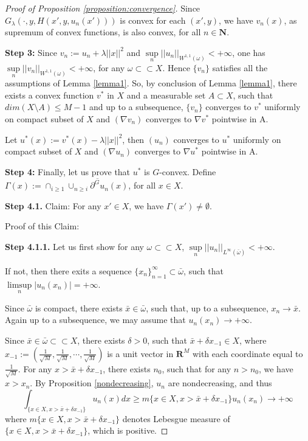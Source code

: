 \documentclass[a4paper, 11pt]{amsart}
\numberwithin{equation}{section}
\theoremstyle{plain}
\theoremstyle{definition}
\theoremstyle{remark}
\newcommand{\R}{\mathbf{R}}
\newcommand{\N}{\mathbf{N}}
\begin{document}
\begin{proof}[Proof of Proposition \ref{proposition:convergence}]
	
	Since $G_{\lambda}(\cdot,y,H(x',y,u_n(x')))$ is convex for each $(x', y)$, we have $v_n(x)$, as supremum of convex functions, is also convex, for all $n \in \N$.\medskip
	
	
	
{\bf Step 3:}	Since $v_n:= u_n +\lambda||x||^2$ and $\sup\limits_{n}||u_n||_{W^{1,1}(\omega)} < +\infty$, one has $\sup\limits_{n}||v_n||_{W^{1,1}(\omega)} < +\infty$, for any $\omega \subset \subset X$. Hence $\{v_n\}$ satisfies all the assumptions of Lemma \ref{lemma1}. So, by conclusion of Lemma \ref{lemma1}, there exists a convex function $v^*$ in $X$ and a measurable set $A \subset X$, such that $dim (X \setminus A)\le M-1$ and up to a subsequence, $\{v_n\}$ converges to $v^*$ uniformly on compact subset of $X$ and $(\nabla v_n)$ converges to $\nabla v^*$ pointwise in A.
	
	Let $u^*(x):=v^*(x)-\lambda||x||^2$, then  $(u_n)$ converges to $u^*$ uniformly on compact subset of $X$ and $(\nabla u_n)$ converges to $\nabla u^*$ pointwise in A.\medskip
	
{\bf Step 4:}	Finally, let us prove that $u^*$ is $G$-convex.\medskip
	Define $\Gamma(x):=\cap_{i\ge 1}\overline{\cup_{n\ge i}\partial^G u_n(x)}$, for all $x\in X$.\medskip
	
	
{\bf	Step 4.1.} Claim: For any $x'\in X$, we have $\Gamma(x') \neq \emptyset$.
	
	Proof of this Claim: 
	
	{\bf Step 4.1.1.} Let us first show for any $\omega \subset\subset X$, $\sup\limits_{n}||u_n||_{L^{\infty}(\bar{\omega})}<+\infty$.
	
	If not, then there exits a sequence $\{x_n\}_{n=1}^{\infty}\subset \bar{\omega}$, such that $\limsup\limits_{n}|u_n(x_n)|=+\infty$.
	
	Since $\bar{\omega}$ is compact, there exists $\bar{x}\in \bar{\omega}$, such that, up to a subsequence, $x_n\rightarrow \bar{x}$. Again up to a subsequence, we may assume that $u_n(x_n)\rightarrow +\infty$.
	
	Since $\bar{x} \in \bar{\omega} \subset \subset X$, there exists $\delta >0$, such that $\bar{x}+\delta x_{-1} \in X$, where $x_{-1}:=(\frac{1}{\sqrt{M}}, \frac{1}{\sqrt{M}}, \cdots, \frac{1}{\sqrt{M}})$ is a unit vector in $\R^M$ with each coordinate equal to $\frac{1}{\sqrt{M}}$. For any $x>\bar{x} + \delta x_{-1}$, there exists $n_0$, such that for any $n>n_0$, we have $x>x_n$. By Proposition \ref{nondecreasing}, $u_n$ are nondecreasing, and thus
	\begin{equation}\label{eqn_integral}
	\int_{\{x\in X, x>\bar{x} +\delta x_{-1}\}} u_n(x)dx \ge m\{x\in X, x> \bar{x}+\delta x_{-1}\} u_n(x_n)\rightarrow +\infty
	\end{equation}
	where $m\{x\in X, x>\bar{x}+\delta x_{-1}\}$ denotes Lebesgue measure of $\{x\in X, x>\bar{x}+\delta x_{-1}\}$, which is positive.
	

\end{proof}
\end{document}
